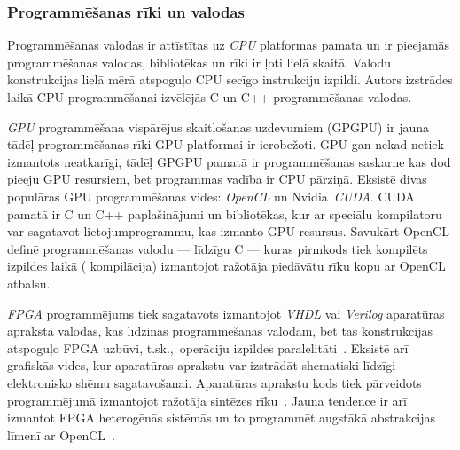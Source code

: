 \subsubsection*{Programmēšanas rīki un valodas}
Programmēšanas valodas ir attīstītas uz \emph{CPU} platformas pamata un
ir pieejamās programmēšanas valodas, bibliotēkas un rīki ir ļoti lielā
skaitā. Valodu konstrukcijas lielā mērā atspoguļo CPU secīgo instrukciju
izpildi. Autors izstrādes laikā CPU programmēšanai izvēlējās C un C++
programmēšanas valodas.

\emph{GPU} programmēšana vispārējus skaitļošanas uzdevumiem (GPGPU) ir jauna
tādēļ programmēšanas rīki GPU platformai ir ierobežoti. GPU gan nekad netiek
izmantots neatkarīgi, tādēļ GPGPU pamatā ir programmēšanas saskarne
kas dod pieeju GPU resursiem, bet programmas vadība ir CPU pārziņā.
Eksistē divas populāras GPU programmēšanas vides: \emph{OpenCL} un
Nvidia~\emph{CUDA}. CUDA pamatā ir C un C++ paplašinājumi un bibliotēkas,
kur ar speciālu kompilatoru var sagatavot lietojumprogrammu, kas izmanto
GPU resursus. Savukārt OpenCL definē programmēšanas valodu --- līdzīgu C ---
kuras pirmkods tiek kompilēts izpildes laikā ( kompilācija)
izmantojot ražotāja piedāvātu rīku kopu ar OpenCL atbalsu.
\cite{Fatahalian}\cite{Owens-GPU}\cite{OpenCL-book}\cite{CUDA}

\emph{FPGA} programmējums tiek sagatavots izmantojot \emph{VHDL} vai
\emph{Verilog} aparatūras apraksta valodas, kas līdzinās programmēšanas
valodām, bet tās konstrukcijas atspoguļo FPGA uzbūvi, t.sk.,~operāciju
izpildes paralelitāti~\cite{JIS}.
Eksistē arī grafiskās vides, kur aparatūras aprakstu
var izstrādāt shematiski līdzīgi elektronisko shēmu sagatavošanai.
Aparatūras aprakstu kods tiek pārveidots programmējumā izmantojot
ražotāja sintēzes rīku~\cite{JIS}. Jauna tendence ir arī izmantot FPGA
heterogēnās sistēmās un to programmēt augstākā abstrakcijas līmenī ar
OpenCL~\cite{FPGA-ocl}.

